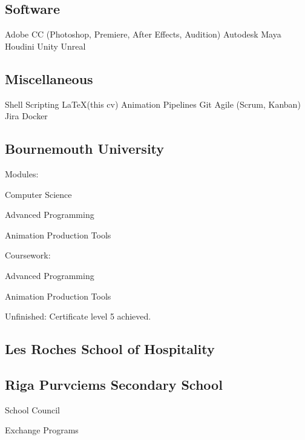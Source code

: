 \documentclass[a4paper]{MagicalCV}
\begin{document}
\begin{minipage}[t]{0.49\textwidth}
 \subsection{Software}
 Adobe CC (Photoshop, Premiere, After Effects, Audition) \textbullet{} Autodesk Maya \textbullet{} Houdini \textbullet{} Unity \textbullet{} Unreal
 \sectionsep
 \subsection{Miscellaneous}
Shell Scripting \textbullet{} \LaTeX  (this cv)  \textbullet{} Animation Pipelines \textbullet{} Git \textbullet{} Agile (Scrum, Kanban) \textbullet{} Jira \textbullet{} Docker
\sectionsep

\subsection{Bournemouth University}
\vspace{\topsep} %
Modules:
\begin{tightemize}
\item Computer Science
\item Advanced Programming
\item Animation Production Tools
\end{tightemize}
 Coursework:
\begin{tightemize}
\item Advanced Programming
\item Animation Production Tools
\end{tightemize}

 Unfinished: Certificate level 5 achieved.
\sectionsep

\subsection{Les Roches School of Hospitality}
\sectionsep


\subsection{Riga Purvciems Secondary School}
\begin{tightemize}
 \item School Council
 \item Exchange Programs
\end{tightemize}
\sectionsep


\end{minipage}
\end{document}
